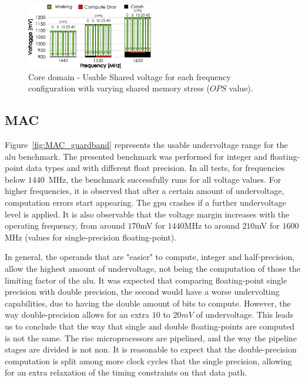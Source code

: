 \begin{figure}[htb]
  \centering
  \includegraphics[width=0.5\textwidth]{Figures/GPU_characterization/SharedMemory_guardband.pdf}
  \caption{Core domain - Usable Shared voltage for each frequency configuration with varying shared memory stress ($OPS$ value).}
  \label{fig:SharedMemory_guardband}
\end{figure}

\subsection{MAC}

Figure~\ref{fig:MAC_guardband} represents the usable undervoltage range for the \acrshort{alu} benchmark. The presented benchmark was performed for integer and floating-point data types and with different float precision. In all tests, for frequencies below $1440$~MHz, the benchmark successfully runs for all voltage values. For higher frequencies, it is observed that after a certain amount of undervoltage, computation errors start appearing. The \acrshort{gpu} crashes if a further undervoltage level is applied. 
It is also observable that the voltage margin increases with the operating frequency, from around $170$mV for $1440$MHz to around $210$mV for $1600$MHz (values for single-precision floating-point).

In general, the operands that are "easier" to compute, integer and half-precision, allow the highest amount of undervoltage, not being the computation of those the limiting factor of the \acrshort{alu}. 
It was expected that comparing floating-point single precision with double precision, the second would have a worse undervolting capabilities, due to having the double amount of bits to compute. However, the way double-precision allows for an extra $10$ to $20mV$ of undervoltage. This leads us to conclude that the way that single and double floating-points are computed is not the same. The \acrshort{risc} microprocessors are pipelined, and the way the pipeline stages are divided is not non. It is reasonable to expect that the double-precision computation is split among more clock cycles that the single precision, allowing for an extra relaxation of the timing constraints on that data path.

